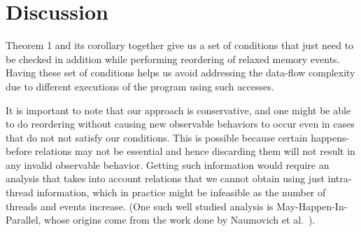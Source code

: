 \section{Discussion} 

    
 
    Theorem 1 and its corollary together give us a set of conditions that just need to be checked in addition while performing reordering of relaxed memory events. Having these set of conditions helps us avoid addressing the data-flow complexity due to different executions of the program using such accesses.    
    
    It is important to note that our approach is conservative, and one might be able to do reordering without causing new observable behaviors to occur even in cases that do not not satisfy our conditions. 
    This is possible because certain happens-before relations may not be essential and hence discarding them will not result in any invalid observable behavior.
    Getting such information would require an analysis that takes into account relations that we cannot obtain using just intra-thread information, which in practice might be infeasible as the number of threads and events increase. (One such well studied analysis is May-Happen-In-Parallel, whose origins come from the work done by Naumovich et al.~\cite{NaumovichA}).
    
